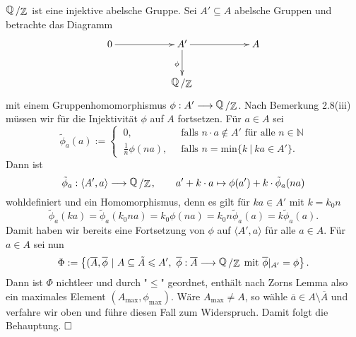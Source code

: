 \documentclass[11pt]{book}
\theoremstyle{nonumberbreak}
\newenvironment{pr}[1][]{\ifthenelse{\equal{#1}{}}{\proof}{\proof[#1]}\rm}{\endproof}
\newenvironment{ex}[1][]{\ifthenelse{\equal{#1}{}}{\example}{\example[#1]}\rm}{\endexample}
\newenvironment{definbem}[1][]{\ifthenelse{\equal{#1}{}}{\definibem}{\definibem[#1]}\rm}{\enddefinibem}
\newcommand{\slant}[2]{{\raisebox{.1em}{$#1$}\left/\raisebox{-.1em}{$#2$}\right.}}
\begin{document}
\begin{spacing}{1.4}
\begin{definbem}
\end{definbem}

\newcommand{\QZ}{\slant{\mathbb{Q}}{\mathbb{Z}}}




\begin{ex}
$\slant{\mathbb{Q}}{\mathbb{Z}}$ ist eine injektive abelsche Gruppe.
\begin{pr}
Sei $A' \subseteq A$ abelsche Gruppen und betrachte das Diagramm
$$
\begin{xy}
\xymatrix{
0 \ar[rr] && A' \ar[rr] \ar[d]_{\phi} && A \\
&& \slant{\mathbb{Q}}{\mathbb{Z}} && 
}
\end{xy}
$$
mit einem Gruppenhomomorphismus $\phi: A' \la \slant{\mathbb{Q}}{\mathbb{Z}}$. Nach Bemerkung 2.8(iii) müssen wir für die Injektivität $\phi$ auf $A$ fortsetzen. Für $a \in A$ sei
$$\tilde{\phi}_a(a) := \begin{cases}\ 0, & \ \textrm{ falls } n \cdot a \notin A' \textrm{ für alle } n \in \mathbb{N} \\ \ \frac{1}{n} \phi(na), & \ \textrm{ falls } n= \mathrm{min} \{k \ \vert \ k a \in A' \}. \end{cases}$$
\end{pr}
Dann ist $$\tilde{\phi}_a: \langle A', a\rangle \la \QZ, \qquad a' + k \cdot a \mapsto \phi(a') + k \cdot  \tilde{\phi}_a(n  a)$$ wohldefiniert und ein Homomorphismus, denn es gilt für $k a \in A'$ mit $k=k_0 n$
$$\tilde{\phi}_a(ka) = \tilde{\phi}_a(k_0na) = k_0 \phi(na) = k_0 n \tilde{\phi}_a(a) = k \tilde{\phi}_a(a).$$
Damit haben wir bereits eine Fortsetzung von $\phi$ auf $\langle A', a\rangle$ für alle $a \in A$. Für $a \in A$ sei nun 
$$\Phi:= \left\{ (\overline{A}, \overline{\phi} \ \vert \ A \subseteq \tilde{A} \leqslant A', \ \overline{\phi}: \overline{A} \la \QZ \textrm{ mit } \overline{\phi} \vert_{A'} = \phi \right\}.$$
Dann ist $\Phi$ nichtleer und durch "$\leqslant$" geordnet, enthält nach Zorns Lemma also ein maximales Element $(A_{\textrm{max}}, \phi_{\textrm{max}})$. Wäre $A_{\textrm{max}} \neq A$, so wähle $\overline{a} \in A \setminus \overline{A}$ und verfahre wir oben und führe diesen Fall zum Widerspruch. Damit folgt die Behauptung. $\hfill \Box$
\end{ex}


\end{spacing}
\end{document}
